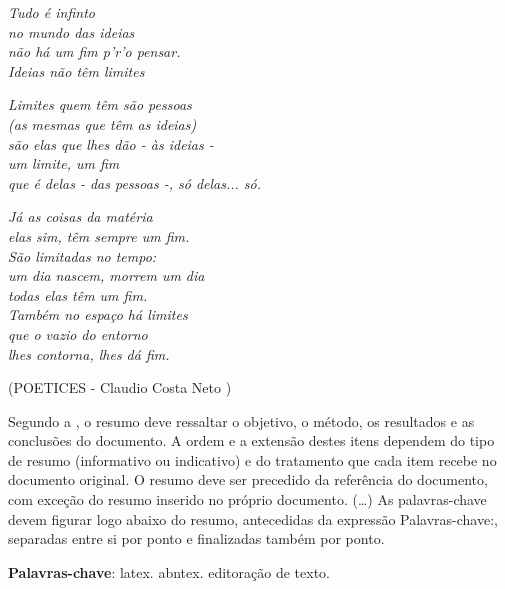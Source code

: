 \documentclass[
	12pt,				%
	openright,			%
	oneside,			%
	a4paper,			%
	chapter=TITLE,		%
	section=TITLE,		%
	sumario=abnt-6027-2012,
	english,			%
	french,				%
	spanish,			%
	brazil				%
	]{abntex2}
\begin{document}
\begin{epigrafe}
	\vspace*{\fill}
	\begin{flushright}
		\textit{Tudo é infinto \\
			no mundo das ideias \\
			não há um fim p'r'o pensar. \\
			Ideias não têm limites \\}
	\end{flushright}
	
	\begin{flushright}
		\textit{Limites quem têm são pessoas \\
			(as mesmas que têm as ideias) \\
			são elas que lhes dão - às ideias - \\
			um limite, um fim \\
			que é delas - das pessoas -, só delas... só. \\}
	\end{flushright}
	
	\begin{flushright}
		\textit{Já as coisas da matéria \\
			elas sim, têm sempre um fim.\\
			São limitadas no tempo: \\
			um dia nascem, morrem um dia \\
			todas elas têm um fim. \\
			Também no espaço há limites \\
			que o vazio do entorno \\
			lhes contorna, lhes dá fim. \\}
	\end{flushright}
	
	\begin{flushright}
		(POETICES - Claudio Costa Neto )
	\end{flushright}
\end{epigrafe}


\setlength{\absparsep}{18pt} %
\begin{resumo}
 Segundo a , o resumo deve ressaltar o
 objetivo, o método, os resultados e as conclusões do documento. A ordem e a extensão
 destes itens dependem do tipo de resumo (informativo ou indicativo) e do
 tratamento que cada item recebe no documento original. O resumo deve ser
 precedido da referência do documento, com exceção do resumo inserido no
 próprio documento. (\ldots) As palavras-chave devem figurar logo abaixo do
 resumo, antecedidas da expressão Palavras-chave:, separadas entre si por
 ponto e finalizadas também por ponto.

 \textbf{Palavras-chave}: latex. abntex. editoração de texto.
\end{resumo}
\end{document}
